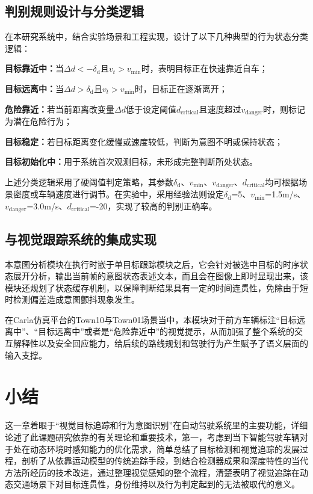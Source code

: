 \subsection{判别规则设计与分类逻辑}

在本研究系统中，结合实验场景和工程实现，设计了以下几种典型的行为状态分类逻辑：

\textbf{目标靠近中：}当$\Delta d < -\delta_{\mathrm{d}}$且$v_t>v_{\text{min}}$时，表明目标正在快速靠近自车；

\textbf{目标远离中：}当$\Delta d > \delta_{\mathrm{d}}$且$v_t>v_{\text{min}}$时，目标正在逐渐离开；

\textbf{危险靠近：}若当前距离改变量$\Delta d$低于设定阈值$d_{\text{critical}}$且速度超过$v_{\text{danger}}$时，则标记为潜在危险行为；

\textbf{目标稳定：}若目标距离变化缓慢或速度较低，判断为意图不明或保持状态；

\textbf{目标初始化中：}用于系统首次观测目标，未形成完整判断所处状态。

上述分类逻辑采用了硬阈值判定策略，其参数$\delta_{\mathrm{d}}$、$v_{\text{min}}$、$v_{\text{danger}}$、$d_{\text{critical}}$均可根据场景密度或车辆速度进行调节。在实验中，采用经验法则设定$\delta_{\mathrm{d}}$=5、$v_{\text{min}}$=1.5m/s、$v_{\text{danger}}$=3.0m/s、$d_{\text{critical}}$=-20，实现了较高的判别正确率。

\subsection{与视觉跟踪系统的集成实现}

本意图分析模块在执行时嵌于单目标跟踪模块之后，它会针对被选中目标的时序状态展开分析，输出当前帧的意图状态表述文本，而且会在图像上即时显现出来，该模块还规划了状态缓存机制，以保障判断结果具有一定的时间连贯性，免除由于短时检测偏差造成意图颤抖现象发生。

在Carla仿真平台的Town10与Town01场景当中，本模块对于前方车辆标注“目标远离中”、“目标远离中”或者是“危险靠近中”的视觉提示，从而加强了整个系统的交互解释性以及安全回应能力，给后续的路线规划和驾驶行为产生赋予了语义层面的输入支撑。

\section{小结}

这一章着眼于“视觉目标追踪和行为意图识别”在自动驾驶系统里的主要功能，详细论述了此课题研究依靠的有关理论和重要技术，第一，考虑到当下智能驾驶车辆对于处在动态环境时感知能力的优化需求，简单总结了目标检测和视觉追踪的发展过程，剖析了从依靠运动模型的传统追踪手段，到结合检测器成果和深度特性的当代方法所经历的技术改进，通过整理视觉感知的整个流程，清楚表明了视觉追踪在动态交通场景下对目标连贯性，身份维持以及行为判定起到的无法被取代的意义。

